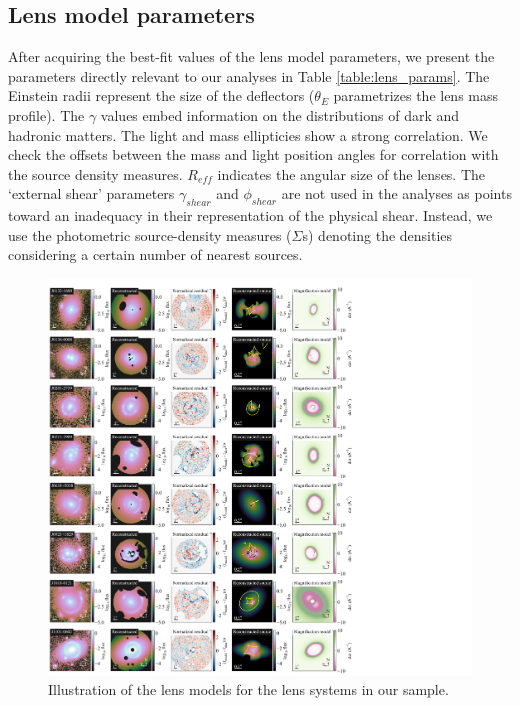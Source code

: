 \documentclass{aa}
\begin{document}
\subsection{Lens model parameters}
After acquiring the best-fit values of the lens model parameters, we present the parameters directly relevant to our analyses in Table \ref{table:lens_params}. The Einstein radii represent the size of the deflectors ($\theta_{E}$ parametrizes the lens mass profile). The $\gamma$ values embed information on the distributions of dark and hadronic matters. The light and mass ellipticies show a strong correlation. We check the offsets between the mass and light position angles for correlation with the source density measures. $R_{eff}$ indicates the angular size of the lenses. The `external shear' parameters $\gamma_{shear}$ and $\phi_{shear}$ are not used in the analyses as \cite{etherington23} points toward an inadequacy in their representation of the physical shear. Instead, we use the photometric source-density measures ($\Sigma$s) denoting the densities considering a certain number of nearest sources.
\begin{figure}
	\centering
	\includegraphics[width=1.5\textwidth]{paper/figures/lens_models_0.pdf}
	\caption{\label{fig:lens_models_0}
	Illustration of the lens models for the lens systems in our sample.
	}
\end{figure}
\end{document}
